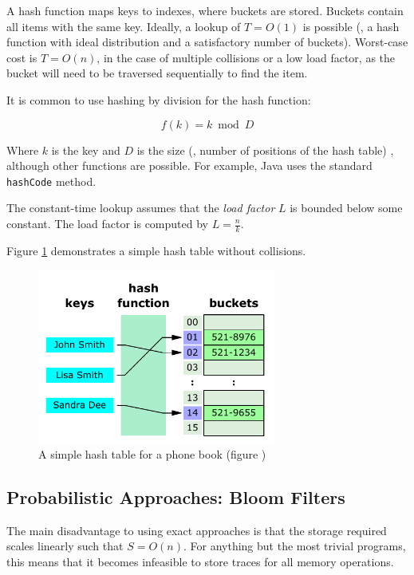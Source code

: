 	A hash function maps keys to indexes, where buckets are stored. Buckets contain all items with the same key. Ideally, a lookup of $T=O(1)$ is possible (\ie, a hash function with ideal distribution and a satisfactory number of buckets). Worst-case cost is $T=O(n)$, in the case of multiple collisions or a low load factor, as the bucket will need to be traversed sequentially to find the item.
		
	It is common to use hashing by division for the hash function:
		
	\[
		f(k) = k \bmod{D}
	\]
		
	Where $k$ is the key and $D$ is the size (\ie, number of positions of the hash table) \citep{DSandAlgsCpp}, although other functions are possible. For example, Java uses the standard \texttt{hashCode} method.
		
	The constant-time lookup assumes that the \textit{load factor} $L$ is bounded below some constant. The load factor is computed by $L=\frac{n}{k}$.
		
	Figure \ref{fig:hash-table} demonstrates a simple hash table without collisions.
		
	\begin{figure}
		\centering
		\includegraphics[width=0.7\textwidth]{graphics/hash-table.pdf}
		\caption{A simple hash table for a phone book (figure  \citet{HashTableWikiDiagram})}
		\label{fig:hash-table}
	\end{figure}

	\subsection{Probabilistic Approaches: Bloom Filters} \label{sec:runtime/storage/probabilistic}
	The main disadvantage to using exact approaches is that the storage required scales linearly such that $S=O(n)$. For anything but the most trivial programs, this means that it becomes infeasible to store traces for all memory operations.
	
